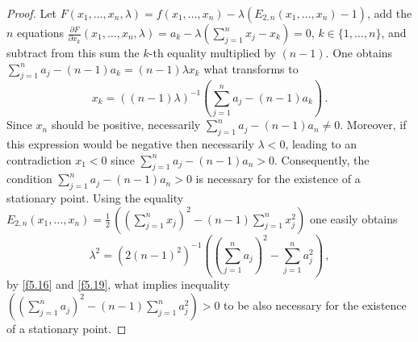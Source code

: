 \documentclass[10pt,a4paper]{amsart}
\begin{document}
\begin{proof}
Let $F(x_1,\ldots,x_n,\lambda) = f(x_1,\ldots,x_n) - \lambda (E_{2,n}(x_1,\ldots,x_n)-1)$, add the $n$ equations $\frac{{\partial} F}{{\partial} x_k} (x_1,\ldots,x_n,\lambda) = a_k-\lambda (\sum_{j=1}^n x_j - x_k)=0$, $k \in \{ 1,\ldots,n \}$, and subtract from this sum the $k$-th equality multiplied by $(n-1)$. One obtains $\sum_{j=1}^n a_j - (n-1)a_k = (n-1) \lambda x_k$ what transforms to
\begin{equation}   \label{f5.19}
    x_k = ((n-1)\lambda)^{-1} \left(\sum_{j=1}^n a_j - (n-1)a_k \right) \, .
\end{equation}
Since $x_n$ should be positive, necessarily $\sum_{j=1}^n a_j - (n-1)a_n \not= 0$. Moreover, if this expression would be negative then necessarily $\lambda < 0$, leading to an contradiction $x_1 <0$ since  $\sum_{j=1}^n a_j - (n-1)a_n > 0$. Consequently, the condition 
$\sum_{j=1}^n a_j - (n-1)a_n  > 0$ is necessary for the existence of a stationary point.  Using the equality $E_{2,n} (x_1,\ldots,x_n) = \frac{1}{2} \, \left((\sum_{j=1}^n x_j)^2 - (n-1) \sum_{j=1}^n x_j^2 \right)$ one easily obtains
\begin{equation}   \label{f5.20_1}
    \lambda^2 =(2 (n-1)^2)^{-1} \left((\sum_{j=1}^n a_j)^2 - \sum_{j=1}^n a_j^2 \right) \, ,
\end{equation}
by \eqref{f5.16} and \eqref{f5.19}, what implies inequality $\left((\sum_{j=1}^n a_j)^2 - (n-1) \sum_{j=1}^n a_j^2\right) > 0$ to be also necessary for the existence of a stationary point.


\end{proof}
\end{document}
